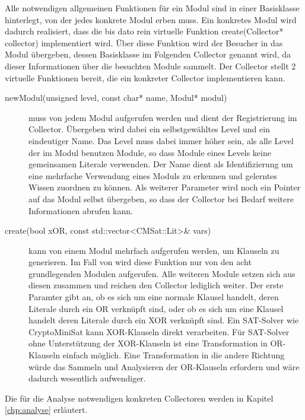 Alle notwendigen allgemeinen Funktionen für ein Modul sind in einer Basisklasse hinterlegt, von der jedes konkrete Modul erben muss. Ein konkretes Modul wird
dadurch realisiert, dass die bis dato rein virtuelle Funktion create(Collector* collector) implementiert wird. Über diese Funktion wird der Besucher in das Modul
übergeben, dessen Basisklasse im Folgenden Collector genannt wird, da dieser Informationen über die besuchten Module sammelt. Der Collector stellt 2 virtuelle
Funktionen bereit, die ein konkreter Collector implementieren kann.
\begin{description}
  \item[newModul(unsigned level, const char* name, Modul* modul)] muss von jedem Modul aufgerufen werden und dient der Registrierung im Collector.
       Übergeben wird dabei ein selbstgewähltes Level und ein eindeutiger Name. Das Level muss dabei immer höher sein, als alle Level der im Modul
       benutzen Module, so dass Module eines Levels keine gemeinsamen Literale verwenden. Der Name dient als Identifizierung um eine mehrfache
       Verwendung eines Moduls zu erkennen und gelerntes Wissen zuordnen zu können. Als weiterer Parameter wird noch ein Pointer auf das Modul
       selbst übergeben, so dass der Collector bei Bedarf weitere Informationen abrufen kann.
  \item[create(bool xOR, const std::vector<CMSat::Lit>\& vars)] kann von einem Modul mehrfach aufgerufen werden, um Klauseln zu generieren.
       Im Fall von  wird diese Funktion nur von den acht grundlegenden Modulen aufgerufen. Alle weiteren Module setzen sich aus
       diesen zusammen und reichen den Collector lediglich weiter. Der erste Paramter gibt an, ob es sich um eine normale Klausel handelt,
       deren Literale durch ein OR verknüpft sind, oder ob es sich um eine Klausel handelt deren Literale durch ein XOR verknüpft sind.
       Ein SAT-Solver wie CryptoMiniSat kann XOR-Klauseln direkt verarbeiten. Für SAT-Solver ohne Unterstützung der XOR-Klauseln ist eine
       Transformation in OR-Klauseln einfach möglich. Eine Transformation in die andere Richtung würde das Sammeln und Analysieren der
       OR-Klauseln erfordern und wäre dadurch wesentlich aufwendiger.
\end{description}
Die für die Analyse notwendigen konkreten Collectoren werden in Kapitel \ref{chp:analyse} erläutert.

